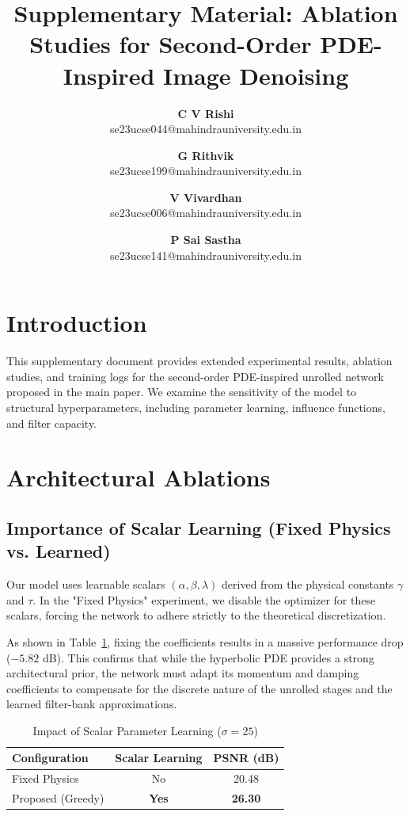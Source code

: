 \documentclass[11pt]{article}
\title{\textbf{Supplementary Material: Ablation Studies for Second-Order PDE-Inspired Image Denoising}}
\author{
    \textbf{C V Rishi} \\ \small se23ucse044@mahindrauniversity.edu.in \and
    \textbf{G Rithvik} \\ \small se23ucse199@mahindrauniversity.edu.in \and
    \textbf{V Vivardhan} \\ \small se23ucse006@mahindrauniversity.edu.in \and
    \textbf{P Sai Sastha} \\ \small se23ucse141@mahindrauniversity.edu.in
}
\date{}
\begin{document}
\maketitle

\section{Introduction}

This supplementary document provides extended experimental results, ablation studies, and training logs for the second-order PDE-inspired unrolled network proposed in the main paper. We examine the sensitivity of the model to structural hyperparameters, including parameter learning, influence functions, and filter capacity.

\section{Architectural Ablations}

\subsection{Importance of Scalar Learning (Fixed Physics vs. Learned)}

Our model uses learnable scalars $(\alpha, \beta, \lambda)$ derived from the physical constants $\gamma$ and $\tau$. In the "Fixed Physics" experiment, we disable the optimizer for these scalars, forcing the network to adhere strictly to the theoretical discretization.

As shown in Table~\ref{tab:physics_ablation}, fixing the coefficients results in a massive performance drop ($-5.82$ dB). This confirms that while the hyperbolic PDE provides a strong architectural prior, the network must adapt its momentum and damping coefficients to compensate for the discrete nature of the unrolled stages and the learned filter-bank approximations.

\begin{table}[h]
	\centering
	\caption{Impact of Scalar Parameter Learning ($\sigma=25$)}
	\label{tab:physics_ablation}
	\begin{tabular}{l c c}
		\toprule
		Configuration      & Scalar Learning & PSNR (dB)      \\
		\midrule
		Fixed Physics      & No              & 20.48          \\
		Proposed (Greedy)  & \textbf{Yes}    & \textbf{26.30} \\
		\bottomrule
	\end{tabular}
\end{table}
\end{document}
